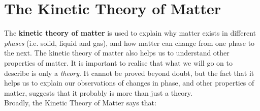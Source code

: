 

\section{The Kinetic Theory of Matter}
\label{sec:micro:kinetic}

The \textbf{kinetic theory of matter} is used to explain why matter exists in different \textit{phases} (i.e. solid, liquid and gas), and how matter can change from one phase to the next. The kinetic theory of matter also helps us to understand other properties of matter. It is important to realise that what we will go on to describe is only a \textit{theory}. It cannot be proved beyond doubt, but the fact that it helps us to explain our observations of changes in phase, and other properties of matter, suggests that it probably is more than just a theory.\\

Broadly, the Kinetic Theory of Matter says that:

